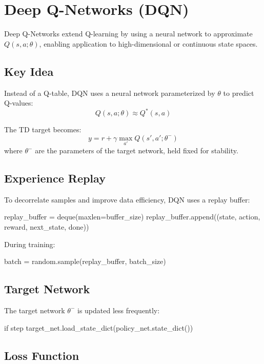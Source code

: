 \documentclass{article}
\begin{document}
\section{Deep Q-Networks (DQN)}

Deep Q-Networks extend Q-learning by using a neural network to approximate $Q(s,a;\theta)$, enabling application to high-dimensional or continuous state spaces.

\subsection{Key Idea}

Instead of a Q-table, DQN uses a neural network parameterized by $\theta$ to predict Q-values:
\begin{equation}
    Q(s,a;\theta) \approx Q^*(s,a)
\end{equation}

The TD target becomes:
\begin{equation}
    y = r + \gamma \max_{a'} Q(s', a'; \theta^{-})
\end{equation}
where $\theta^{-}$ are the parameters of the target network, held fixed for stability.

\subsection{Experience Replay}

To decorrelate samples and improve data efficiency, DQN uses a replay buffer:
\begin{python}
replay_buffer = deque(maxlen=buffer_size)
replay_buffer.append((state, action, reward, next_state, done))
\end{python}

During training:
\begin{python}
batch = random.sample(replay_buffer, batch_size)
\end{python}

\subsection{Target Network}

The target network $\theta^-$ is updated less frequently:
\begin{python}
if step %
    target_net.load_state_dict(policy_net.state_dict())
\end{python}

\subsection{Loss Function}
\end{document}
